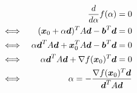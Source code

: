 \documentclass[dvipdfmx,a4j]{jsarticle}
\begin{document}
                  \begin{eqnarray*}
                    &&\frac{d}{d\alpha}f(\alpha) = 0\\
                    \Longleftrightarrow \ && (\mbox{\boldmath $x$}_{0}+\alpha \mbox{\boldmath $d$})^{T}A\mbox{\boldmath $d$}-\mbox{\boldmath $b$}^{T}\mbox{\boldmath $d$} = 0\\
                    \Longleftrightarrow\ && \alpha \mbox{\boldmath $d$}^{T}A\mbox{\boldmath $d$}+\mbox{\boldmath $x$}_{0}^{T}A\mbox{\boldmath $d$}-\mbox{\boldmath $b$}^{T}\mbox{\boldmath $d$} = 0\\
                    \Longleftrightarrow \ && \alpha \mbox{\boldmath $d$}^{T}A\mbox{\boldmath $d$}+\nabla f(\mbox{\boldmath $x$}_{0})^{T}\mbox{\boldmath $d$}=0\\
                    \Longleftrightarrow\ && \alpha = -\frac{\nabla f(\mbox{\boldmath $x$}_{0})^{T}\mbox{\boldmath $d$}}{\mbox{\boldmath $d$}^{T}A\mbox{\boldmath $d$}}
                  \end{eqnarray*}
\end{document}
